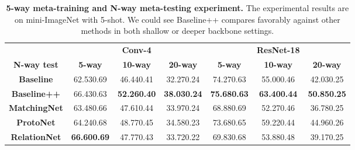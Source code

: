 \documentclass{article}
\newcommand{\tb}[1]{\textbf{#1}}
\begin{document}
\begin{table}[h]
\centering
\caption{\tb{5-way meta-training and N-way meta-testing experiment.} The experimental results are on mini-ImageNet with 5-shot. We could see Baseline++ compares favorably against other methods in both shallow or deeper backbone settings.}
\label{tab:practical}
\begin{tabular}{ccccccc}
\toprule
            &                & \tb{Conv-4}      &                &                & \tb{ResNet-18}   &                \\
\tb{N-way test} &\tb{5-way} &\tb{10-way}&\tb{20-way}&\tb{5-way} &\tb{10-way}&\tb{20-way}\\
\midrule
\small{\tb{Baseline}}    & \small{62.530.69} & \small{46.440.41} & \small{32.270.24} & \small{74.270.63} & \small{55.000.46} & \small{42.030.25} \\
\small{\tb{Baseline++}}  & \small{66.430.63} & \small{\tb{52.260.40}} & \small{\tb{38.030.24}} & \small{\tb{75.680.63}} & \small{\tb{63.400.44}} & \small{\tb{50.850.25}} \\
\midrule
\small{\tb{MatchingNet}} & \small{63.480.66} & \small{47.610.44} & \small{33.970.24} & \small{68.880.69} & \small{52.270.46} & \small{36.780.25} \\
\small{\tb{ProtoNet}}   & \small{64.240.68} & \small{48.770.45} & \small{34.580.23} & \small{73.680.65} & \small{59.220.44} & \small{44.960.26} \\
\small{\tb{RelationNet}} & \small{\tb{66.600.69}} & \small{47.770.43} & \small{33.720.22} & \small{69.830.68} & \small{53.880.48} & \small{39.170.25} \\

\bottomrule
\end{tabular}
\end{table}  
\end{document}
